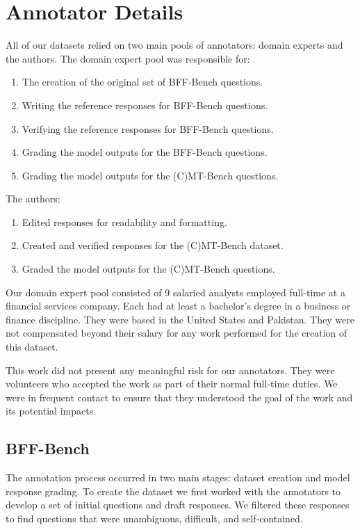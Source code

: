 \clearpage
\label{sec:appendix}

\section{Annotator Details}
\label{sec:annotator_details}
All of our datasets relied on two main pools of annotators: domain experts and the authors. The domain expert pool was responsible for:
\begin{enumerate}
    \item The creation of the original set of BFF-Bench questions.
    \item Writing the reference responses for BFF-Bench questions.
    \item Verifying the reference responses for BFF-Bench questions.
    \item Grading the model outputs for the BFF-Bench questions.
    \item Grading the model outputs for the (C)MT-Bench questions.
\end{enumerate}

The authors:
\begin{enumerate}
    \item Edited responses for readability and formatting.
    \item Created and verified responses for the (C)MT-Bench dataset.
    \item Graded the model outputs for the (C)MT-Bench questions.
\end{enumerate}

Our domain expert pool consisted of 9 salaried analysts employed full-time at a financial services company. Each had at least a bachelor's degree in a business or finance discipline. They were based in the United States and Pakistan. They were not compensated beyond their salary for any work performed for the creation of this dataset.

This work did not present any meaningful risk for our annotators. They were volunteers who accepted the work as part of their normal full-time duties. We were in frequent contact to ensure that they understood the goal of the work and its potential impacts. 

\subsection{BFF-Bench}
The annotation process occurred in two main stages: dataset creation and model response grading. To create the dataset we first worked with the annotators to develop a set of initial questions and draft responses. We filtered these responses to find questions that were unambiguous, difficult, and self-contained.

